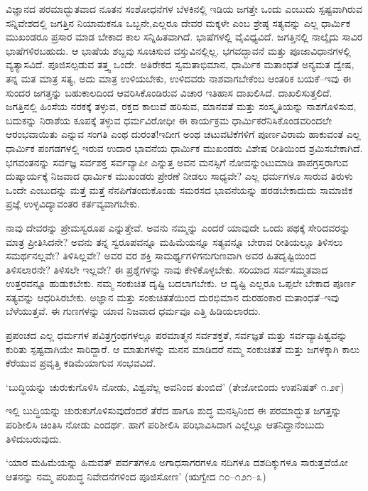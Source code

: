 ವಿಜ್ಞಾನದ ಪರಮಾದ್ಭುತವಾದ ನೂತನ ಸಂಶೋಧನೆಗಳ ಬೆಳಕಿನಲ್ಲಿ ಇಡಿಯ ಜಗತ್ತೇ ಒಂದು ಎಂಬುದು ಸ್ಪಷ್ಟವಾಗಿರುವ ಸನ್ನಿವೇಶದಲ್ಲಿ ಜಗತ್ತಿನ ನಿಯಾಮಕನೂ ಒಬ್ಬನೇ,ಎಲ್ಲರೂ ದೇವರ ಮಕ್ಕಳೇ ಎಂಬ ಶ್ರೇಷ್ಠ ಸತ್ಯವನ್ನು ಎಲ್ಲ ಧಾರ್ಮಿಕ ಮುಖಂಡರೂ ಪ್ರಸಾರ ಮಾಡ ಬೇಕಾದ ಕಾಲ ಸನ್ನಿಹಿತವಾಗಿದೆ. ಭಾಷೆಗಳಲ್ಲಿ ವೈವಿಧ್ಯವಿದೆ. ಜಗತ್ತಿನಲ್ಲಿ ನಾಲ್ಕೈದು ಸಾವಿರ ಭಾಷೆಗಳಿರಬಹುದು. ಆ ಭಾಷೆಯ ಶಬ್ದವು ಸೂಚಿಸುವ ವಸ್ತುವಿನಲ್ಲಿಲ್ಲ. ಭಗವದ್ಭಾವನೆ ಮತ್ತು ಪೂಜಾವಿಧಾನಗಳಲ್ಲಿ ವ್ಯತ್ಯಾಸವಿದೆ. ಪೂಜಿಸಲ್ಪಡುವ ತತ್ತ್ವ ಒಂದೇ. ಅತಿರೇಕದ ಸ್ವಮತಾಭಿಮಾನ, ಧಾರ್ಮಿಕ ಮತಾಂಧತೆ ಅನ್ಯಮತ ದ್ವೇಷ, ತನ್ನ ಮತ ಮಾತ್ರ ಸತ್ಯ, ಅದು ಮಾತ್ರ ಉಳಿಯಬೇಕು, ಉಳಿದವರು ನಾಶವಾಗಬೇಕೆಂಬ ಆಂತರಿಕ ಬಯಕೆ–ಇವು ಈ ಸುಂದರ ಜಗತ್ತನ್ನು ಬಹುಕಾಲದಿಂದ ಆವರಿಸಿಕೊಂಡಿರುವ ವಿಚಾರ ಇತಿಹಾಸ ದಾಖಲಿಸಿದೆ. ದಾಖಲಿಸುತ್ತಲಿದೆ. ಜಗತ್ತಿನಲ್ಲಿ ಹಿಂಸೆಯ ನರಕಕ್ಕೆ ತಳ್ಳುವ, ರಕ್ತದ ಕಾಲುವೆ ಹರಿಸುವ, ಮಾನವತೆ ಮತ್ತು ಸಂಸ್ಕೃತಿಯನ್ನು ನಾಶಗೊಳಿಸುವ, ಬದುಕನ್ನು ನಿರಾಶೆಯ ಕೂಪಕ್ಕೆ ತಳ್ಳುವ ಧರ್ಮವಿರೋಧೀ ಈ ಕಾರ್ಯಕ್ರಮ ಧಾರ್ಮಿಕರೆನಿಸಿಕೊಂಡವರಿಂದಲೇ ಆರಂಭವಾಯಿತು ಎನ್ನುವ ಸಂಗತಿ ಎಂಥ ದುರಂತ!\break ಇದೀಗ ಅಂಥ ಚಟುವಟಿಕೆಗಳಿಗೆ ಪೂರ್ಣವಿರಾಮ ಹಾಕುವಂತೆ ಎಲ್ಲ ಧಾರ್ಮಿಕ ಪಂಗಡಗಳಲ್ಲಿ ಇರುವ ಉದಾರ ಭಾವನೆಯ ಧಾರ್ಮಿಕ ಮುಖಂಡರು ವಿಶೇಷ ರೀತಿಯಿಂದ ಶ್ರಮಿಸಬೇಕಾಗಿದೆ. ಭಗವಂತನನ್ನು ಸರ್ವಜ್ಞ ಸರ್ವಶಕ್ತ ಸರ್ವವ್ಯಾಪೀ ಎನ್ನುತ್ತ ಅವನ ಮನಸ್ಸಿಗೆ ನೋವನ್ನುಂಟು\-ಮಾಡಿ ಶಾಪಗ್ರಸ್ತರಾಗುವ ದುಷ್ಕಾರ್ಯಕ್ಕೆ ನಿಜವಾದ ಧಾರ್ಮಿಕ ಮುಖಂಡರು ಪ್ರೇರಣೆ ನೀಡಲು ಸಾಧ್ಯವೇ? ಎಲ್ಲ ಧರ್ಮಗಳೂ ಸಾರುವ ತಿರುಳು ಒಂದೇ ಎಂಬುದನ್ನು ಮತ್ತೆ ಮತ್ತೆ ನೆನಪಿಗೆ\break ತಂದುಕೊಂಡು ಸಮರಸದ ಭಾವನೆಯನ್ನು ಹರಡಬೇಕಾದುದು ಸಾಮಾಜಿಕ ಪ್ರಜ್ಞೆ ಉಳ್ಳ\break ವಿದ್ಯಾವಂತರ ಕರ್ತವ್ಯವಾಗಬೇಕು.

ನಾವು ದೇವರನ್ನು ಪ್ರೇಮಸ್ವರೂಪ ಎನ್ನುತ್ತೇವೆ. ಅವನು ನಮ್ಮನ್ನು ಎಂದರೆ ಯಾವುದೇ ಒಂದು ಪಥಕ್ಕೆ ಸೇರಿದವರನ್ನು ಮಾತ್ರ ಪ್ರೀತಿಸಿದನೇ? ಅವನು ತನ್ನ ಸ್ವರೂಪವನ್ನೂ ಮಹಿಮೆಯನ್ನೂ ಸತ್ಯವನ್ನೂ ಬೇರಾವ ರೀತಿಯಲ್ಲೂ ತಿಳಿಸಲು ಸಮರ್ಥನಲ್ಲವೇ? ತಿಳಿಸಿಲ್ಲವೇ? ಅವರ ವರ ಶಕ್ತಿ ಸಾಮರ್ಥ್ಯಗಳಿಗನುಗುಣವಾಗಿ ಅವರ ಹಿತದೃಷ್ಟಿಯಿಂದ ತಿಳಿಸಲಾರನೇ? ತಿಳಿಸಲೇ ಇಲ್ಲವೇ? ಈ ಪ್ರಶ್ನೆಗಳನ್ನು ನಾವು ಕೇಳಿಕೊಳ್ಳಬೇಕು. ಸರಿಯಾದ ಸರ್ವಸಮ್ಮತವಾದ ಉತ್ತರವನ್ನೂ ಹುಡುಕಬೇಕು. ನಮ್ಮ ಸಂಕುಚಿತ ದೃಷ್ಟಿ ಬದಲಾಗಬೇಕು. ಆ ದೃಷ್ಟಿ ಎಲ್ಲರೂ ಒಪ್ಪಲೇ ಬೇಕಾದ ಪೂರ್ಣ ಸತ್ಯವನ್ನು ಆಧರಿಸಿರಬೇಕು. ಅಜ್ಞಾನ ಮತ್ತು ಸಂಕುಚಿತತೆಯಿಂದ ದುರಭಿಮಾನ ದುರಹಂಕಾರ ಮತಾಂಧತೆ–ಇವು ಬೆಳೆಯುತ್ತವೆ. ಈ ಗುಣಗಳನ್ನು ಯಾವ ನಿಜವಾದ ಧರ್ಮವೂ ಎತ್ತಿ ಹಿಡಿಯಲಾರದು.

\newpage

ಪ್ರಪಂಚದ ಎಲ್ಲ ಧರ್ಮಗಳ ಪವಿತ್ರಗ್ರಂಥಗಳಲ್ಲೂ ಪರಮಾತ್ಮನ ಸರ್ವಶಕ್ತತೆ, ಸರ್ವಜ್ಞತೆ ಮತ್ತು ಸರ್ವವ್ಯಾಪಿತ್ವವನ್ನು ಕುರಿತು ಸ್ಪಷ್ಟವಾಗಿಯೇ ಸಾರಿದ್ದಾರೆ. ಆ ಮಾತುಗಳನ್ನು ಮನನ ಮಾಡಿದರೆ ನಮ್ಮ ಸಂಕುಚಿತತೆ ಮತ್ತು ಜಗಳಕ್ಕಾಗಿ ಕಾಲು ಕೆರೆಯುವ ಪ್ರವೃತ್ತಿ ಕಡಿಮೆಯಾಗುವ ಸಂಭವವಿದೆ.

‘ಬುದ್ಧಿಯನ್ನು ಚುರುಕುಗೊಳಿಸಿ ನೋಡು, ವಿಶ್ವವೆಲ್ಲ ಅವನಿಂದ ತುಂಬಿದೆ’ (ತೇಜೋಬಿಂದು ಉಪನಿಷತ್ ೧.೨೯)

ಇಲ್ಲಿ ಬುದ್ಧಿಯನ್ನು ಚುರುಕುಗೊಳಿಸುವುದೆಂದರೆ ತೆರೆದ ಹಾಗೂ ಶುದ್ಧ ಮನಸ್ಸಿನಿಂದ ಈ ಪರಮಾದ್ಭುತ ಜಗತ್ತನ್ನು ಪರಿಶೀಲಿಸಿ ಚಿಂತಿಸಿ ನೋಡು ಎಂದರ್ಥ. ಹಾಗೆ ಪರಿಶೀಲಿಸಿ ಪರಿಭಾವಿಸಿದಾಗ ಎಲ್ಲೆಲ್ಲೂ ಆತನಿದ್ದಾನೆಂಬುದು ತಿಳಿದುಬರುವುದು.

‘ಯಾರ ಮಹಿಮೆಯನ್ನು ಹಿಮವತ್ ಪರ್ವತಗಳೂ ಅಗಾಧಸಾಗರಗಳೂ ನದಿಗಳೂ ದಶದಿಕ್ಕುಗಳೂ ಸಾರುತ್ತವೆಯೋ ಆತನನ್ನು ನಮ್ಮ ಪರಿಶುದ್ಧ ನಿವೇದನೆಗಳಿಂದ ಪೂಜಿಸೋಣ’ (ಋಗ್ವೇದ ೧೦–೧೨೧–೩)

